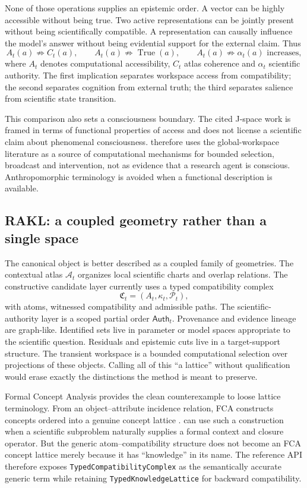 None of those operations supplies an epistemic order. A vector can be highly accessible without being true. Two active representations can be jointly present without being scientifically compatible. A representation can causally influence the model's answer without being evidential support for the external claim. Thus
\[
A_t(a)\not\Rightarrow C_t(a),\qquad
A_t(a)\not\Rightarrow \operatorname{True}(a),\qquad
A_t(a)\not\Rightarrow \alpha_t(a)\text{ increases},
\]
where \(A_t\) denotes computational accessibility, \(C_t\) atlas coherence and \(\alpha_t\) scientific authority. The first implication separates workspace access from compatibility; the second separates cognition from external truth; the third separates salience from scientific state transition.

This comparison also sets a consciousness boundary. The cited J-space work is framed in terms of functional properties of access and does not license a scientific claim about phenomenal consciousness. \RAKL{} therefore uses the global-workspace literature as a source of computational mechanisms for bounded selection, broadcast and intervention, not as evidence that a research agent is conscious. Anthropomorphic terminology is avoided when a functional description is available.

\subsection{RAKL: a coupled geometry rather than a single space}

The canonical \RAKL{} object is better described as a coupled family of geometries. The contextual atlas \(\mathcal A_t\) organizes local scientific charts and overlap relations. The constructive candidate layer currently uses a typed compatibility complex
\[
\mathfrak C_t=(A_t,\kappa_t,\mathcal P_t),
\]
with atoms, witnessed compatibility and admissible paths. The scientific-authority layer is a scoped partial order \(\mathsf{Auth}_t\). Provenance and evidence lineage are graph-like. Identified sets live in parameter or model spaces appropriate to the scientific question. Residuals and epistemic cuts live in a target-support structure. The transient workspace is a bounded computational selection over projections of these objects. Calling all of this ``a lattice'' without qualification would erase exactly the distinctions the method is meant to preserve.

Formal Concept Analysis provides the clean counterexample to loose lattice terminology. From an object--attribute incidence relation, FCA constructs concepts ordered into a genuine concept lattice \cite{ganterwille2024}. \RAKL{} can use such a construction when a scientific subproblem naturally supplies a formal context and closure operator. But the generic atom--compatibility structure does not become an FCA concept lattice merely because it has ``knowledge'' in its name. The reference API therefore exposes \texttt{TypedCompatibilityComplex} as the semantically accurate generic term while retaining \texttt{TypedKnowledgeLattice} for backward compatibility.

